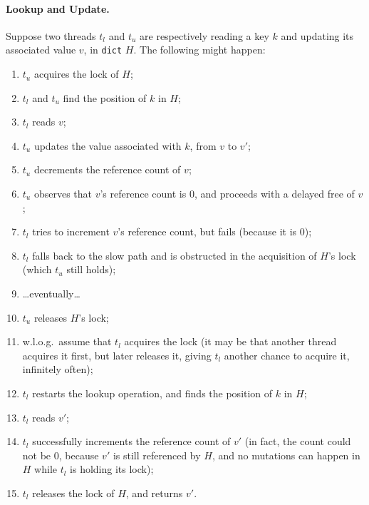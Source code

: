\paragraph{Lookup and Update.}
Suppose two threads $t_l$ and $t_u$ are respectively reading a key $k$ and updating its associated value $v$, in \texttt{dict} $H$.
The following might happen:
\begin{enumerate}
	\item $t_u$ acquires the lock of $H$;
	\item $t_l$ and $t_u$ find the position of $k$ in $H$;
	\item $t_l$ reads $v$;
	\item $t_u$ updates the value associated with $k$, from $v$ to $v'$;
	\item $t_u$ decrements the reference count of $v$;
	\item $t_u$ observes that $v$'s reference count is 0, and proceeds with a delayed free of $v$;
	\item $t_l$ tries to increment $v$'s reference count, but fails (because it is 0);
	\item $t_l$ falls back to the slow path and is obstructed in the acquisition of $H$'s lock (which $t_u$ still holds);
	\item {\ldots}eventually{\ldots}
	\item $t_u$ releases $H$'s lock;
	\item w.l.o.g.\ assume that $t_l$ acquires the lock (it may be that another thread acquires it first, but later releases it, giving $t_l$ another chance to acquire it, infinitely often);
	\item $t_l$ restarts the lookup operation, and finds the position of $k$ in $H$;
	\item $t_l$ reads $v'$;
	\item $t_l$ successfully increments the reference count of $v'$ (in fact, the count could not be 0, because $v'$ is still referenced by $H$, and no mutations can happen in $H$ while $t_l$ is holding its lock);
	\item $t_l$ releases the lock of $H$, and returns $v'$.
\end{enumerate}

